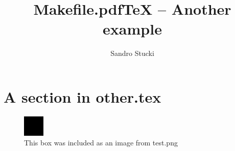 \documentclass{article}
\title{Makefile.pdfTeX -- Another example}
\author{Sandro Stucki}
\begin{document}
\maketitle

\section{A section in other.tex}



\begin{figure}[tbh]
  \centering
  \includegraphics[height=1cm]{img/test}
  \caption{This box was included as an image from test.png}
  \label{fig:test-box}
\end{figure}
\end{document}
